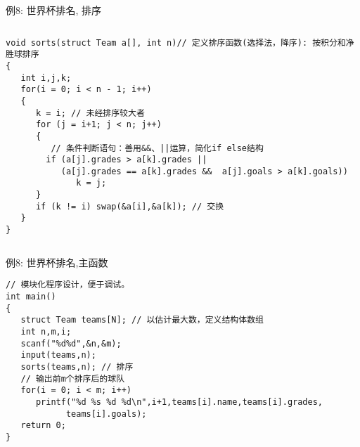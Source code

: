 \begin{frame}{例8: 世界杯排名, 排序}
\vspace{-0.5cm}
\begin{columns}[T]
\begin{lstlisting}
void sorts(struct Team a[], int n)// 定义排序函数(选择法，降序): 按积分和净胜球排序 
{
   int i,j,k;
   for(i = 0; i < n - 1; i++)
   {
      k = i; // 未经排序较大者
      for (j = i+1; j < n; j++)
      {
         // 条件判断语句：善用&&、||运算，简化if else结构 
        if (a[j].grades > a[k].grades || 
           (a[j].grades == a[k].grades &&  a[j].goals > a[k].goals))  
              k = j;
      }
      if (k != i) swap(&a[i],&a[k]); // 交换
   } 
}
\end{lstlisting}
\end{columns}
\medskip
\end{frame}

\begin{frame}{例8: 世界杯排名,主函数}
\vspace{-0.4cm}
\begin{lstlisting}
// 模块化程序设计，便于调试。
int main()
{
   struct Team teams[N]; // 以估计最大数，定义结构体数组 
   int n,m,i;
   scanf("%d%d",&n,&m);
   input(teams,n); 
   sorts(teams,n); // 排序
   // 输出前m个排序后的球队 
   for(i = 0; i < m; i++)
      printf("%d %s %d %d\n",i+1,teams[i].name,teams[i].grades,
      		teams[i].goals);
   return 0;
}
\end{lstlisting}
\end{frame}

